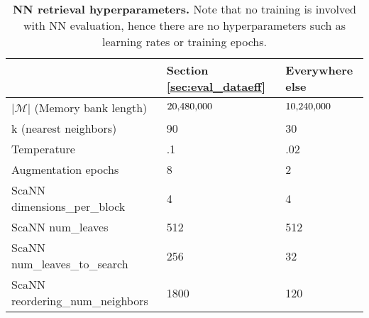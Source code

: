 \begin{table}[ht]
\small
\centering
\caption{\textbf{NN retrieval hyperparameters.} Note that no training is involved with NN evaluation, hence there are no hyperparameters such as learning rates or training epochs.}
\begin{tabular}{@{}lll@{}}
\toprule
                              & Section \ref{sec:eval_dataeff} & Everywhere else \\ \midrule
\(|\mathcal{M}|\) (Memory bank length)       & \(20{\small,}480{\small,}000\)           & \(10{\small,}240{\small,}000\)               \\
k (nearest neighbors)         & 90           & 30               \\
Temperature                   & .1           & .02               \\
Augmentation epochs        & 8           & 2               \\
ScaNN dimensions\_per\_block  & 4           & 4               \\
ScaNN num\_leaves             & 512           & 512               \\
ScaNN num\_leaves\_to\_search & 256           & 32               \\
ScaNN reordering\_num\_neighbors & 1800           & 120              
\end{tabular}
\label{tab:appendix_eval_hyperparams}
\end{table}
